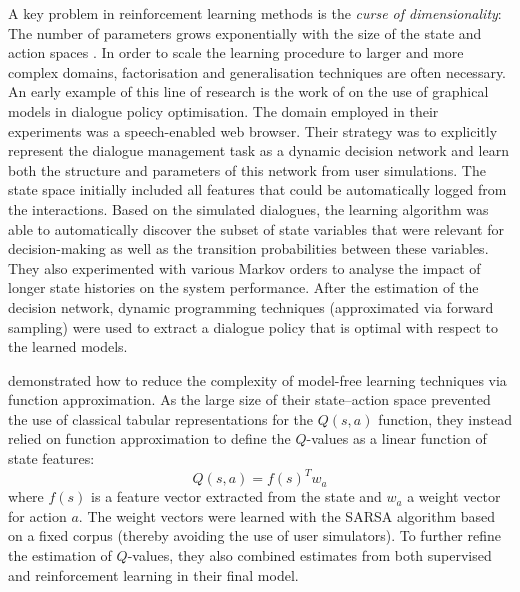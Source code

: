 A key problem in reinforcement learning methods is the \textit{curse of dimensionality}: The number of parameters grows exponentially with the size of the state and action spaces \citep{citeulike:112017}.  In order to scale the learning procedure to larger and more complex domains, factorisation and generalisation techniques are often necessary.  An early example of this line of research is the work of \cite{PaekC06} on the use of graphical models in dialogue policy optimisation. The domain employed in their experiments was a speech-enabled web browser.  Their strategy was to explicitly represent the dialogue management task as a dynamic decision network and learn both the structure and parameters of this network from user simulations.  The state space initially included all features that could be automatically logged from the interactions.  Based on the simulated dialogues, the learning algorithm was able to automatically discover the subset of state variables that were relevant for decision-making as well as the transition probabilities between these variables.   They also experimented with various Markov orders to analyse the impact of longer state histories on the system performance.  After the estimation of the decision network, dynamic programming techniques (approximated via forward sampling) were used to extract a dialogue policy that is optimal with respect to the learned models. %

\cite{Henderson:2008} demonstrated how to reduce the complexity of model-free learning techniques via function approximation.  As the large size of their state--action space prevented the use of classical tabular representations for the $Q(s,a)$ function, they instead relied on function approximation to define the $Q$-values as a linear function of state features:
\begin{equation}
Q(s,a) = f(s)^{T} w_a 
\end{equation}
where $f(s)$ is a feature vector extracted from the state and $w_a$ a weight vector for action $a$. The weight vectors were learned with the SARSA algorithm based on a fixed corpus (thereby avoiding the use of user simulators). To further refine the estimation of $Q$-values, they also combined estimates from both supervised and reinforcement learning in their final model. 

